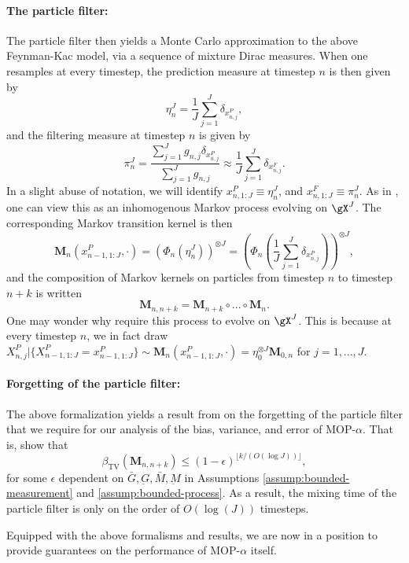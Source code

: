 \paragraph{\bf The particle filter:} The particle filter then yields a Monte Carlo approximation to the above Feynman-Kac model, via a sequence of mixture Dirac measures. When one resamples at every timestep, the prediction measure at timestep $n$ is then given by 
\begin{equation}
\eta_n^J = \frac{1}{J}\sum_{j=1}^J \delta_{x_{n,j}^P},
\end{equation}
and the filtering measure at timestep $n$ is given by
\begin{equation}
\pi_n^J = \frac{\sum_{j=1}^J g_{n,j} \delta_{x_{n,j}^P}}{\sum_{j=1}^J g_{n,j}} \approx \frac{1}{J} \sum_{j=1}^J \delta_{x_{n,j}^F}.
\end{equation}
In a slight abuse of notation, we will identify $x_{n, 1:J}^P \equiv \eta_n^J$, and $x_{n, 1:J}^F \equiv \pi_n^J$. 
As in \cite{karjalainen23}, one can view this as an inhomogenous Markov process evolving on $\gX^{J}$. The corresponding Markov transition kernel is then 
\begin{equation}
\textbf{M}_n(x_{n-1, 1:J}^P, \cdot) = \left(\Phi_{n}\left(\eta_n^J\right)\right)^{\otimes J} = \left(\Phi_{n}\left(\frac{1}{J}\sum_{j=1}^J \delta_{x_{n,j}^P}\right)\right)^{\otimes J},
\end{equation}
and the composition of Markov kernels on particles from timestep $n$ to timestep $n+k$ is written 
\begin{equation}
\textbf{M}_{n, n+k} = \textbf{M}_{n+k}\circ ...\circ \textbf{M}_n.
\end{equation}
One may wonder why \cite{karjalainen23} require this process to evolve on $\gX^{J}$. This is because at every timestep $n$, we in fact draw $X_{n, j}^P | \{X_{n-1, 1:J}^P = x_{n-1, 1:J}^P\} \sim \textbf{M}_n(x_{n-1, 1:J}^P, \cdot) = \eta_0^{\otimes J} \textbf{M}_{0,n}$ for $j=1,...,J$. 

\paragraph{\bf Forgetting of the particle filter:} 
The above formalization yields a result from \cite{karjalainen23} on the forgetting of the particle filter that we require for our analysis of the bias, variance, and error of MOP-$\alpha$.  
That is, \cite{karjalainen23} show that
\begin{equation}
\beta_{\mathrm{TV}}\left(\mathbf{M}_{n, n+k}\right) \leq(1-\epsilon)^{\lfloor k /(O(\log J))\rfloor},
\end{equation}
for some $\epsilon$ dependent on $\bar{G}, \underbar{G}, \bar{M}, \underbar{M}$ in Assumptions \ref{assump:bounded-measurement} and \ref{assump:bounded-process}. As a result, the mixing time of the particle filter is only on the order of $O(\log(J))$ timesteps. 


\vspace{3mm}

Equipped with the above formalisms and results, we are now in a position to provide guarantees on the performance of MOP-$\alpha$ itself. 
